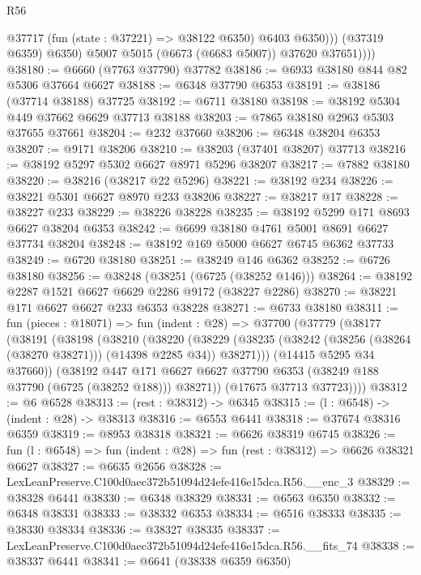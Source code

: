 \begin{lexlean}{R56}
\begin{coremodule}
                  @37717 (fun (state : @37221) => @38122 @6350) @6403 @6350)))
              (@37319 @6359)
              @6350)
            @5007
            @5015
            (@6673 (@6683 @5007))
            @37620
            @37651))))
@38180 := @6660 (@7763 @37790) @37782
@38186 := @6933 @38180 @844 @82 @5306 @37664 @6627
@38188 := @6348 @37790 @6353
@38191 := @38186 (@37714 @38188) @37725
@38192 := @6711 @38180
@38198 := @38192 @5304 @449 @37662 @6629 @37713 @38188
@38203 := @7865 @38180 @2963 @5303 @37655 @37661
@38204 := @232 @37660
@38206 := @6348 @38204 @6353
@38207 := @9171 @38206
@38210 := @38203 (@37401 @38207) @37713
@38216 := @38192 @5297 @5302 @6627 @8971 @5296 @38207
@38217 := @7882 @38180
@38220 := @38216 (@38217 @22 @5296)
@38221 := @38192 @234
@38226 := @38221 @5301 @6627 @8970 @233 @38206
@38227 := @38217 @17
@38228 := @38227 @233
@38229 := @38226 @38228
@38235 := @38192 @5299 @171 @8693 @6627 @38204 @6353
@38242 := @6699 @38180 @4761 @5001 @8691 @6627 @37734 @38204
@38248 := @38192 @169 @5000 @6627 @6745 @6362 @37733
@38249 := @6720 @38180
@38251 := @38249 @146 @6362
@38252 := @6726 @38180
@38256 := @38248 (@38251 (@6725 (@38252 @146)))
@38264 := @38192 @2287 @1521 @6627 @6629 @2286 @9172 (@38227 @2286)
@38270 := @38221 @171 @6627 @6627 @233 @6353 @38228
@38271 := @6733 @38180
@38311 := fun (pieces : @18071) =>
  fun (indent : @28) =>
  @37700
    (@37779
      (@38177
        (@38191
          (@38198
            (@38210
              (@38220
                (@38229
                  (@38235 (@38242 (@38256 (@38264 (@38270 @38271))) (@14398 @2285 @34)) @38271)))
              (@14415 @5295 @34 @37660))
            (@38192
              @447
              @171
              @6627
              @6627
              @37790
              @6353
              (@38249 @188 @37790 (@6725 (@38252 @188)))
              @38271))
          (@17675 @37713 @37723))))
@38312 := @6 @6528
@38313 := (rest : @38312) -> @6345
@38315 := (l : @6548) -> (indent : @28) -> @38313
@38316 := @6553 @6441
@38318 := @37674 @38316 @6359
@38319 := @8953 @38318
@38321 := @6626 @38319 @6745
@38326 := fun (l : @6548) => fun (indent : @28) => fun (rest : @38312) => @6626 @38321 @6627
@38327 := @6635 @2656
@38328 := LexLeanPreserve.C100d0aec372b51094d24efe416e15dca.R56.__enc_3
@38329 := @38328 @6441
@38330 := @6348 @38329
@38331 := @6563 @6350
@38332 := @6348 @38331
@38333 := @38332 @6353
@38334 := @6516 @38333
@38335 := @38330 @38334
@38336 := @38327 @38335
@38337 := LexLeanPreserve.C100d0aec372b51094d24efe416e15dca.R56.__fits_74
@38338 := @38337 @6441
@38341 := @6641 (@38338 @6359 @6350)

\end{coremodule}
\end{lexlean}
